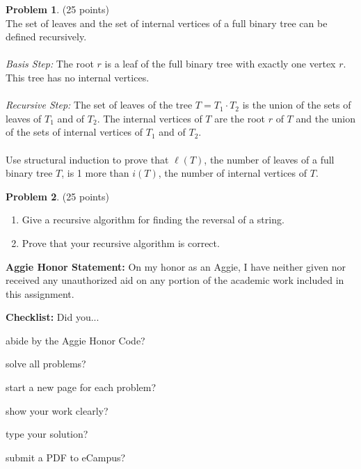 \documentclass{article}
\theoremstyle{definition}
\newtheorem{problem}{Problem}
\newtheorem*{solution}{Solution}
\newcommand{\honor}{\noindent \textbf{Aggie Honor Statement: }On my honor as an Aggie, I have neither
  given nor received any unauthorized aid on any portion of the academic work included in this assignment.
}
\newcommand{\checklist}{\noindent\textbf{Checklist:}
Did you...
\begin{compactenum}
\item abide by the Aggie Honor Code?
\item solve all problems?
\item start a new page for each problem?
\item show your work clearly?
\item type your solution?
\item submit a PDF to eCampus?
\end{compactenum}
}
\begin{document}
\begin{problem} (25 points)\\
The set of leaves and the set of internal vertices of a full binary tree can be defined recursively.\\
\\
\textit{Basis Step:} The root $r$ is a leaf of the full binary tree with exactly one vertex $r$.  This tree has no internal vertices.\\
\\
\textit{Recursive Step:} The set of leaves of the tree $T=T_1\cdot T_2$ is the union of the sets of leaves of $T_1$ and of $T_2$.  The internal vertices of $T$ are the root $r$ of $T$ and the union of the sets of internal vertices of $T_1$ and of $T_2$.\\
\\
Use structural induction to prove that $\ell(T)$, the number of leaves of a full binary tree $T$, is 1 more than $i(T)$, the number of internal vertices of $T$.
\end{problem}



\begin{problem} (25 points)
\begin{enumerate}
\item Give a recursive algorithm for finding the reversal of a string.
\item Prove that your recursive algorithm is correct.
\end{enumerate}
\end{problem}


\newpage


\bigskip
\honor

\bigskip
\checklist
\end{document}
